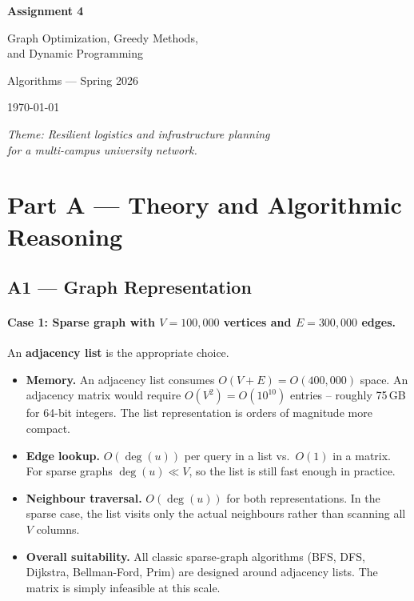 \documentclass[11pt,a4paper]{article}
\begin{document}
\begin{titlepage}
  \centering
  \vspace*{2cm}
  {\Huge\bfseries Assignment 4\par}
  \vspace{0.5cm}
  {\LARGE Graph Optimization, Greedy Methods,\\[4pt] and Dynamic Programming\par}
  \vspace{1.5cm}
  {\large Algorithms --- Spring 2026\par}
  \vspace{0.5cm}
  {\large\today\par}
  \vfill
  \textit{Theme: Resilient logistics and infrastructure planning\\
  for a multi-campus university network.}
\end{titlepage}

\tableofcontents
\newpage

\section{Part A --- Theory and Algorithmic Reasoning}

\subsection{A1 --- Graph Representation}

\paragraph{Case 1: Sparse graph with $V = 100{,}000$ vertices and $E = 300{,}000$ edges.}

An \textbf{adjacency list} is the appropriate choice.

\begin{itemize}[noitemsep]
  \item \textbf{Memory.} An adjacency list consumes $O(V + E) = O(400{,}000)$ space. An adjacency matrix would require $O(V^2) = O(10^{10})$ entries -- roughly 75\,GB for 64-bit integers. The list representation is orders of magnitude more compact.
  \item \textbf{Edge lookup.} $O(\deg(u))$ per query in a list vs.\ $O(1)$ in a matrix. For sparse graphs $\deg(u) \ll V$, so the list is still fast enough in practice.
  \item \textbf{Neighbour traversal.} $O(\deg(u))$ for both representations. In the sparse case, the list visits only the actual neighbours rather than scanning all $V$ columns.
  \item \textbf{Overall suitability.} All classic sparse-graph algorithms (BFS, DFS, Dijkstra, Bellman-Ford, Prim) are designed around adjacency lists. The matrix is simply infeasible at this scale.
\end{itemize}
\end{document}
